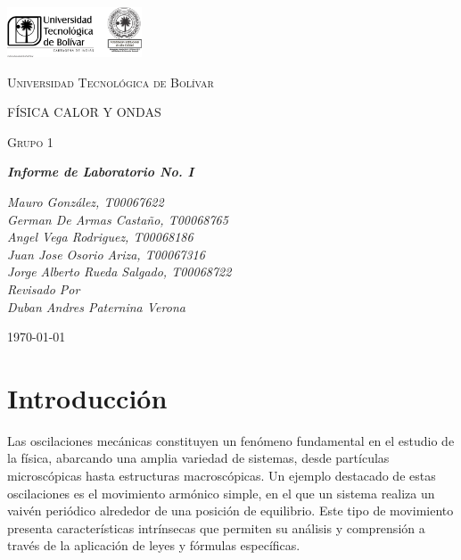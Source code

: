 \documentclass[twocolumn, 12pt]{article}
\begin{document}
\begin{titlepage}
    \centering
    \includegraphics[width=0.3\textwidth]{Images/logo_utb.png}\par\vspace{1cm}
    {\scshape\LARGE Universidad Tecnológica de Bolívar \par}
    \vspace{1cm}

    {\scshape\Large FÍSICA CALOR Y ONDAS \par}
    \vspace{.2cm}

    {\scshape\Large Grupo 1 \par}
    \vspace{1cm}
    \slshape {\Large \bfseries{}Informe de Laboratorio No. I\\}
    \vspace{2cm}

    \slshape {\itshape{} Mauro González, T00067622 \\}
    \slshape {\itshape{} German De Armas Castaño, T00068765 \\}
    \slshape {\itshape{} Angel Vega Rodriguez, T00068186 \\}
    \slshape {\itshape{} Juan Jose Osorio Ariza, T00067316 \\}
    \slshape {\itshape{} Jorge Alberto Rueda Salgado, T00068722 \\}
    \vfill
    Revisado Por \\
    Duban Andres Paternina Verona\\
    {\large \today\par}
\end{titlepage}

\section{Introducción}

Las oscilaciones mecánicas constituyen un fenómeno
fundamental en el estudio de la física, abarcando una
amplia variedad de sistemas, desde partículas microscópicas
hasta estructuras macroscópicas. Un ejemplo destacado de
estas oscilaciones es el movimiento armónico simple, en el
que un sistema realiza un vaivén periódico alrededor de una
posición de equilibrio. Este tipo de movimiento presenta
características intrínsecas que permiten su análisis y
comprensión a través de la aplicación de leyes y fórmulas
específicas.
\end{document}
